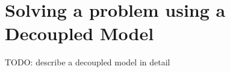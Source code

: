 \section[Decoupled model]{Solving a problem using a Decoupled Model}\label{tutorial-decoupled}

\begin{lst} \mbox{}

\end{lst}

TODO: describe a decoupled model in detail